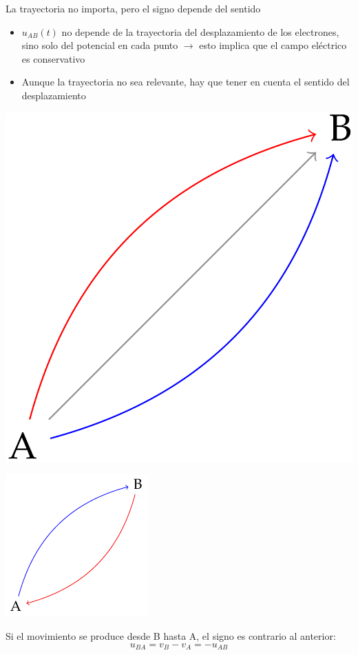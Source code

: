 \documentclass[aspectratio=169, xcolor={usenames,svgnames,dvipsnames}]{beamer}
\begin{document}

\begin{frame}{La trayectoria no importa, pero el signo depende del sentido}
    \begin{minipage}[c]{0.6\linewidth}
        \begin{itemize}
        \item $u_{AB}(t)$ \alert{no depende de la trayectoria} del desplazamiento de los electrones, sino solo del potencial en cada punto $\rightarrow$ esto implica que el \alert{campo eléctrico} es \alert{conservativo}
        \vspace{12mm}
        \item Aunque la trayectoria no sea relevante, hay que tener en cuenta el \alert{sentido del desplazamiento}
    \end{itemize}
    \end{minipage}
    \hfill
    \begin{minipage}[c]{0.35\linewidth}
    \vspace{5mm}
    \includegraphics[width=0.5\linewidth]{../figs/diagrama_tension.PNG}
    
    \includegraphics[width=0.5\linewidth]{../figs/sentido_tension.pdf}
    \end{minipage}
    
    Si el movimiento se produce desde B hasta A, el signo es contrario al anterior:
    \begin{equation*}
      u_{BA} = v_B - v_A = - u_{AB} 
    \end{equation*}
\end{frame}
\end{document}

